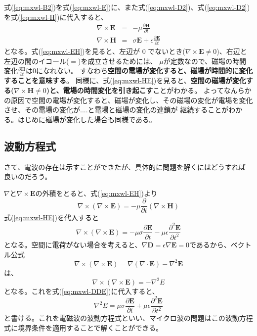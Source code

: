 式(\ref{eq:mxwl-B2})を式(\ref{eq:mxwl-E})に、また式(\ref{eq:mxwl-D2})、式(\ref{eq:mxwl-D2})を式(\ref{eq:mxwl-H})に代入すると、
\begin{eqnarray}
\nabla \times \bm{E} &=& -\mu\frac{\partial \bm{H}}{\partial t} \label{eq:mxwl-EH}\\
\nabla \times \bm{H} &=& \sigma\bm{E} + \epsilon\frac{\partial \bm{E}}{\partial t} \label{eq:mxwl-HE}
\end{eqnarray}
となる。式(\ref{eq:mxwl-EH})を見ると、左辺が $0$ でないとき($\nabla\times\bm{E}\neq 0$)、右辺と左辺の間のイコール($=$)を成立させるためには、
$\mu$が定数なので、磁場の時間変化$\frac{\partial \bm{H}}{\partial t}$は$0$になれない。
すなわち\textbf{空間の電場が変化すると、磁場が時間的に変化することを意味する}。
同様に、式(\ref{eq:mxwl-HE})を見ると、\textbf{空間の磁場が変化する($\nabla\times\bm{H}\neq 0$)と、電場の時間変化を引き起こす}ことがわかる。
よってなんらかの原因で空間の電場が変化すると、磁場が変化し、その磁場の変化が電場を変化させ、その電場の変化が....と電場と磁場の変化の連鎖が
継続することがわかる。はじめに磁場が変化した場合も同様である。

\subsection*{波動方程式}
さて、電波の存在は示すことができたが、具体的に問題を解くにはどうすれば
良いのだろう。

$\nabla$と$\nabla\times\bm{E}$の外積をとると、式(\ref{eq:mxwl-EH})より
\[
\nabla\times(\nabla\times\bm{E}) = -\mu \frac{\partial}{\partial t}(\nabla\times\bm{H})
\]
式(\ref{eq:mxwl-HE})を代入すると
\begin{equation}
\nabla\times(\nabla\times\bm{E}) = -\mu \sigma\frac{\partial\bm{E}}{\partial t} - \mu\epsilon\frac{\partial^2 \bm{E}}{\partial t^2} \label{eq:mxwl-DDE}
\end{equation}
となる。空間に電荷がない場合を考えると、$\nabla\bm{D}=\epsilon\nabla\bm{E} = 0$であるから、ベクトル公式
\[\nabla\times(\nabla\times\bm{E}) = \nabla(\nabla\cdot\bm{E})-\nabla^2\bm{E}
\]
は、
\[
\nabla\times(\nabla\times\bm{E}) = -\nabla^2 E
\]
となる。これを式(\ref{eq:mxwl-DDE})に代入すると、
\begin{equation}
\nabla^2 E = \mu \sigma\frac{\partial\bm{E}}{\partial t} + \mu\epsilon\frac{\partial^2 \bm{E}}{\partial t^2} \label{eq:mxwl-wveq}
\end{equation}
と書ける。これを電磁波の波動方程式といい、マイクロ波の問題はこの波動方程式に境界条件を適用することで解くことができる。

